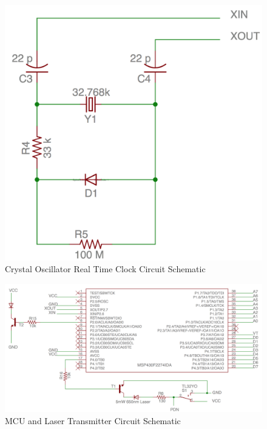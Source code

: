 \documentclass[letterpaper,10pt]{article}
\begin{document}
\begin{spacing}{1.15}
\begin{figure} [H]
	\centering
	\includegraphics[scale=0.35]{Crystal_Oscillator_Schematic.png}
	\caption{Crystal Oscillator Real Time Clock Circuit Schematic\label{fig:crystal-oscillator-schematic}}
\end{figure}

\begin{figure} [H]
	\centering
	\includegraphics[scale=0.43]{MCU_Laser_Schematic.png}
	\caption{MCU and Laser Transmitter Circuit Schematic\label{fig:mcu-laser-schematic}}
\end{figure}


\end{spacing}
\end{document}
